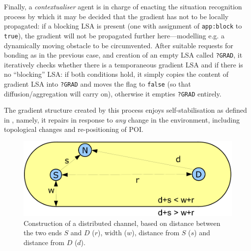 \documentclass[12pt,a4paper,twoside,openright]{book}
\begin{document}
Finally, a \emph{contextualiser} agent is in charge of enacting the situation recognition process by which it may be decided that the gradient has not to be locally propagated: if a blocking LSA is present (one with assignment of \texttt{app:block} to \texttt{true}), the gradient will not be propagated further here---modelling e.g. a dynamically moving obstacle to be circumvented.
%
After suitable requests for bonding as in the previous case, and creation of an empty LSA called \texttt{?GRAD}, it iteratively checks whether there is a temporaneous gradient LSA and if there is no ``blocking'' LSA: if both conditions hold, it simply copies the content of gradient LSA into \texttt{?GRAD} and moves the flag to \texttt{false} (so that diffusion/aggregation will carry on), otherwise it empties \texttt{?GRAD} entirely.

The gradient structure created by this process enjoys self-stabilisation as defined in \cite{VD-COORD2014-LNCS2014}, namely, it repairs in response to \emph{any} change in the environment, including topological changes and re-positioning of POI.

\begin{figure}
\centering\includegraphics[width=\textwidth]{img/channel}
\caption[Distributed channel]{Construction of a distributed channel, based on distance between the two ends $S$ and $D$ ($r$), width ($w$), distance from $S$ ($s$) and distance from $D$ ($d$).}\label{f:preview}
\end{figure}
\end{document}
